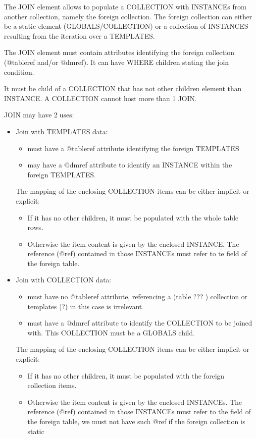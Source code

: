 The JOIN element allows to populate a COLLECTION with INSTANCEs from another collection, namely the foreign collection.
The foreign collection can either be a static element (GLOBALS/COLLECTION) or a collection of INSTANCES resulting from the iteration over a TEMPLATES.

The JOIN element must contain attributes identifying the foreign collection  (@tableref and/or @dmref). 
It can have WHERE children stating the join condition.

It must be child of a COLLECTION that has not other children element than INSTANCE. A COLLECTION cannot host more than 1 JOIN.

JOIN may have 2 uses:

\begin{itemize}

  \item Join with TEMPLATES data:
       \begin{itemize}
         \item must have a @tableref attribute identifying the foreign TEMPLATES
         \item may have a @dmref attribute to identify an INSTANCE within the foreign TEMPLATES.
       \end{itemize}
       The mapping of the enclosing COLLECTION items can be either implicit or explicit:
       \begin{itemize}
         \item If it has no other children, it must be populated with the whole table rows.
         \item Otherwise the item content is given by the enclosed INSTANCE. 
                 The reference (@ref) contained in those INSTANCEs must refer to te field of the foreign table.
       \end{itemize}
       
  \item Join with COLLECTION data:
       \begin{itemize}
         \item must have no @tableref attribute, referencing a (table ??? ) collection or templates (?) in this case is irrelevant.
         \item must have a @dmref attribute to identify the COLLECTION to be joined with. This COLLECTION must be a GLOBALS child.
       \end{itemize}
       The mapping of the enclosing COLLECTION items can be either implicit or explicit:
       \begin{itemize}
         \item If it has no other children, it must be populated with the foreign collection items.
         \item Otherwise the item content is given by the enclosed INSTANCEs. The reference (@ref) contained in those INSTANCEs must refer to the field of the foreign table, we must not have such @ref if the foreign collection is static
       \end{itemize}
           
\end{itemize}

